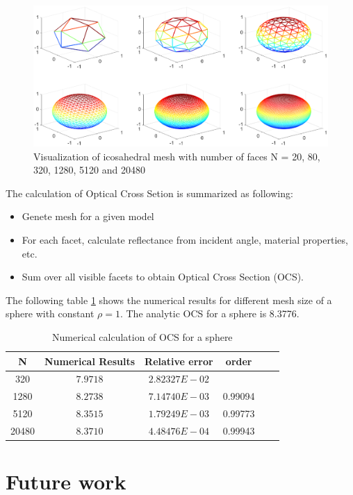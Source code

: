 \documentclass[11pt]{amsart}
\theoremstyle{definition}
\begin{document}
\begin{figure}     	\centerline{\includegraphics[width=7.2in]{./figs/icosahedron.eps}}
		\caption{Visualization of icosahedral mesh with number of faces N = 20, 80, 320, 1280, 5120 and 20480}
        \label{fig:facet}
\end{figure}
The calculation of Optical Cross Setion is summarized as following:
\begin{itemize}
\item Genete mesh for a given model
\item For each facet, calculate reflectance from incident angle, material properties, etc.
\item Sum over all visible facets to obtain Optical Cross Section (OCS).
\end{itemize} 
The following table \ref{table: sphere OCS} shows the numerical results for different mesh size of a sphere with constant $\rho=1$. The analytic OCS for a sphere is 8.3776.
\begin{table}[htp]
	\small
	\caption{Numerical calculation of OCS for a sphere
	}
	\centering
	\begin{tabular}{|c|c|c|c|c|c|}
	\hline
	N & Numerical Results & Relative error & order \\
	\hline
	320 & $7.9718$ & $2.82327E-02$ &  \\
    \hline	
	1280 & $8.2738$ & $7.14740E-03$ & 0.99094 \\
    \hline	
	5120 & $8.3515$ & $1.79249E-03$ & 0.99773 \\
	\hline
	20480 & $8.3710$ & $4.48476E-04$ & 0.99943 \\
	\hline
	\end{tabular}
	\label{table: sphere OCS}
\end{table}
\section{Future work}
\end{document}
